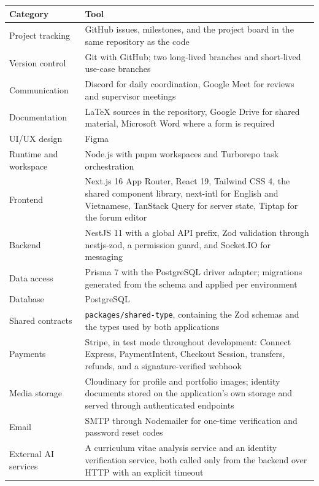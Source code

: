 \begin{table}[H]
\centering
\begin{tabular}{|p{3.5cm}|p{9.9cm}|}
\hline
\rowcolor{headerbg}
\textbf{Category} & \textbf{Tool} \\
\hline
Project tracking & GitHub issues, milestones, and the project board in the same repository as the code \\
\hline
Version control & Git with GitHub; two long-lived branches and short-lived use-case branches \\
\hline
Communication & Discord for daily coordination, Google Meet for reviews and supervisor meetings \\
\hline
Documentation & LaTeX sources in the repository, Google Drive for shared material, Microsoft Word where a form is required \\
\hline
UI/UX design & Figma \\
\hline
Runtime and workspace & Node.js with pnpm workspaces and Turborepo task orchestration \\
\hline
Frontend & Next.js 16 App Router, React 19, Tailwind CSS 4, the shared component library, next-intl for English and Vietnamese, TanStack Query for server state, Tiptap for the forum editor \\
\hline
Backend & NestJS 11 with a global API prefix, Zod validation through nestjs-zod, a permission guard, and Socket.IO for messaging \\
\hline
Data access & Prisma 7 with the PostgreSQL driver adapter; migrations generated from the schema and applied per environment \\
\hline
Database & PostgreSQL \\
\hline
Shared contracts & \texttt{packages/shared-type}, containing the Zod schemas and the types used by both applications \\
\hline
Payments & Stripe, in test mode throughout development: Connect Express, PaymentIntent, Checkout Session, transfers, refunds, and a signature-verified webhook \\
\hline
Media storage & Cloudinary for profile and portfolio images; identity documents stored on the application's own storage and served through authenticated endpoints \\
\hline
Email & SMTP through Nodemailer for one-time verification and password reset codes \\
\hline
External AI services & A curriculum vitae analysis service and an identity verification service, both called only from the backend over HTTP with an explicit timeout \\

\end{tabular}
\end{table}
